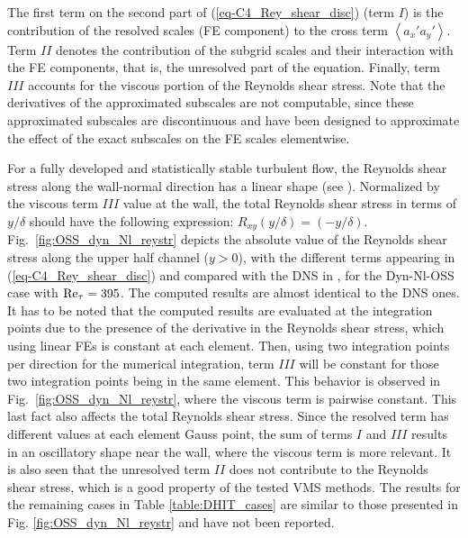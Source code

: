 The first term on the second part of  (\ref{eq-C4_Rey_shear_disc}) (term $I$) is the contribution of the resolved scales (FE component) to the cross term $\left\langle a_x'a_y'\right\rangle$. Term $II$ denotes the contribution of the subgrid scales and their interaction with the FE components, that is, the unresolved part of the equation. Finally, term $III$ accounts for the viscous portion of the Reynolds shear stress. Note that the derivatives of the approximated subscales are not computable, since these approximated subscales are discontinuous and have been designed to approximate the effect of the exact subscales on the FE scales elementwise. 

For a fully developed and statistically stable turbulent flow, the Reynolds shear stress along the wall-normal direction has a linear shape  (see \cite{kim_turbulence_1987}). Normalized by the viscous term $III$ value at the wall, the total Reynolds shear stress in terms of $y/	\delta$ should have the following expression: $R_{xy}(y/\delta)=(-y/\delta)$. Fig.~\ref{fig:OSS_dyn_Nl_reystr} depicts the absolute value of the Reynolds shear stress along the upper half channel ($y>0$), with the different terms appearing in (\ref{eq-C4_Rey_shear_disc}) and compared with the DNS in \cite{moser_direct_1999}, for the Dyn-Nl-OSS case with ${\rm Re}_\tau=395$. The computed results are almost identical to the DNS ones. It has to be noted that the computed results are evaluated at the integration points due to the presence of the derivative in the Reynolds shear stress, which using linear FEs is constant at each element. Then, using two integration points per direction for the numerical integration, term $III$ will be constant for those two integration points being in the same element. This behavior is observed in Fig.~\ref{fig:OSS_dyn_Nl_reystr}, where the viscous term is pairwise constant. This last fact also affects the total Reynolds shear stress. Since the resolved term has different values at each element Gauss point, the sum of terms $I$ and $III$ results in an oscillatory shape near the wall, where the viscous term is more relevant. It is also seen that the unresolved term $II$ does not contribute to the Reynolds shear stress, which is a good property of the tested VMS methods. The results for the remaining cases in Table \ref{table:DHIT_cases} are similar to those presented in Fig. \ref{fig:OSS_dyn_Nl_reystr} and have not been reported. 

